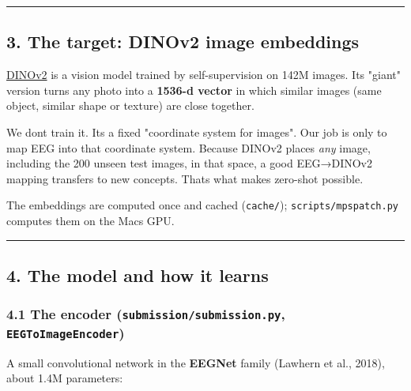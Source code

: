 \documentclass[
  11pt,
]{article}
\renewcommand{\_}{\oldunderscore\allowbreak}
\begin{document}
\begin{center}\rule{0.5\linewidth}{0.5pt}\end{center}

\subsection{3. The target: DINOv2 image
embeddings}\label{the-target-dinov2-image-embeddings}

\href{https://arxiv.org/abs/2304.07193}{DINOv2}
is a vision model trained by
self-supervision on 142M images. Its
"giant" version turns any photo into a
\textbf{1536-d vector} in which similar
images (same object, similar shape or
texture) are close together.

We don\textquotesingle t train it.
It\textquotesingle s a fixed "coordinate
system for images". Our job is only to
map EEG into that coordinate system.
Because DINOv2 places \emph{any} image,
including the 200 unseen test images, in
that space, a good EEG→DINOv2 mapping
transfers to new concepts.
That\textquotesingle s what makes
zero-shot possible.

The embeddings are computed once and
cached (\texttt{cache/});
\texttt{scripts/mps\_patch.py} computes
them on the Mac\textquotesingle s GPU.

\begin{center}\rule{0.5\linewidth}{0.5pt}\end{center}

\subsection{4. The model and how it
learns}\label{the-model-and-how-it-learns}

\subsubsection{\texorpdfstring{4.1 The
encoder
(\texttt{submission/submission.py},
\texttt{EEGToImageEncoder})}{4.1 The encoder (submission/submission.py, EEGToImageEncoder)}}\label{the-encoder-submissionsubmission.py-eegtoimageencoder}

A small convolutional network in the
\textbf{EEGNet} family (Lawhern et al.,
2018), about 1.4M parameters:
\end{document}
